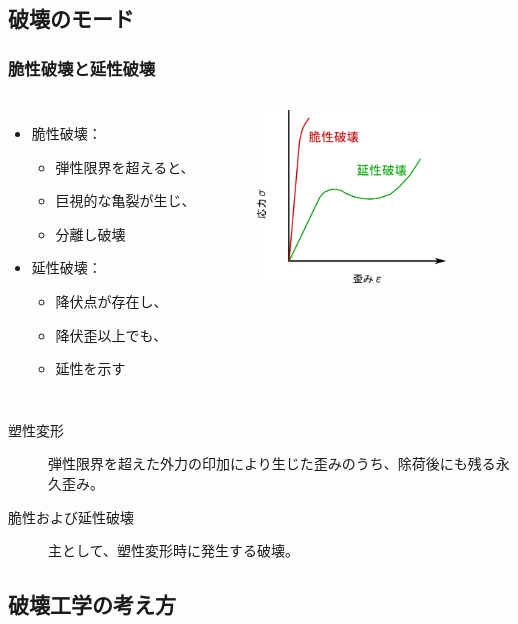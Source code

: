 \documentclass[1４pt, dvipdfmx]{beamer}
\begin{document}
\subsection{破壊のモード}
\begin{frame}
\frametitle{脆性破壊と延性破壊}

\begin{columns}[totalwidth=1\textwidth]
	\begin{itemize}
	\item 脆性破壊：
		\begin{itemize}
		\item 
		弾性限界を超えると、
		\item
		巨視的な亀裂が生じ、
		\item
		分離し破壊
		\end{itemize}
	\item 延性破壊：
		\begin{itemize}
		\item 
		降伏点が存在し、
		\item
		降伏歪以上でも、
		\item
		延性を示す
		\end{itemize}
	\end{itemize}
	\begin{figure}
	\centering
	\includegraphics[width=50mm]{S_S_Curve_2.png}
	\end{figure}
\end{columns}

\begin{description}
\item[塑性変形]
弾性限界を超えた外力の印加により生じた歪みのうち、除荷後にも残る永久歪み。
\item[脆性および延性破壊]
主として、塑性変形時に発生する破壊。
\end{description}
\end{frame}

\subsection{破壊工学の考え方}
\end{document}

